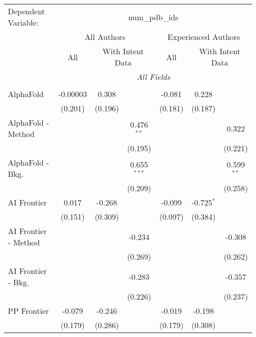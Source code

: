 \begingroup
\centering
\begin{tabular}{lcccccc}
   \tabularnewline \midrule \midrule
   Dependent Variable: & \multicolumn{6}{c}{num\_pdb\_ids}\\
 & \multicolumn{3}{c}{All Authors} & \multicolumn{3}{c}{Experienced Authors} \\
\cmidrule(lr){2-4} \cmidrule(lr){5-7}
 & \multicolumn{1}{c}{All} & \multicolumn{2}{c}{With Intent Data} & \multicolumn{1}{c}{All} & \multicolumn{2}{c}{With Intent Data} \\
\cmidrule(lr){2-2} \cmidrule(lr){3-4} \cmidrule(lr){5-5} \cmidrule(lr){6-7}
 & \multicolumn{6}{c}{\textit{All Fields}} \\ \\
   AlphaFold            & -0.00003 & 0.308   &               & -0.081  & 0.228          &   \\   
                        & (0.201)  & (0.196) &               & (0.181) & (0.187)        &   \\   
   AlphaFold - Method   &          &         & 0.476$^{**}$  &         &                & 0.322\\   
                        &          &         & (0.195)       &         &                & (0.221)\\   
   AlphaFold - Bkg.     &          &         & 0.655$^{***}$ &         &                & 0.599$^{**}$\\   
                        &          &         & (0.209)       &         &                & (0.258)\\   
   AI Frontier          & 0.017    & -0.268  &               & -0.099  & -0.725$^{*}$   &   \\   
                        & (0.151)  & (0.309) &               & (0.097) & (0.384)        &   \\   
   AI Frontier - Method &          &         & -0.234        &         &                & -0.308\\   
                        &          &         & (0.269)       &         &                & (0.262)\\   
   AI Frontier - Bkg.   &          &         & -0.283        &         &                & -0.357\\   
                        &          &         & (0.226)       &         &                & (0.237)\\   
   PP Frontier          & -0.079   & -0.246  &               & -0.019  & -0.198         &   \\   
                        & (0.179)  & (0.286) &               & (0.179) & (0.308)        &   \\   

\end{tabular}
